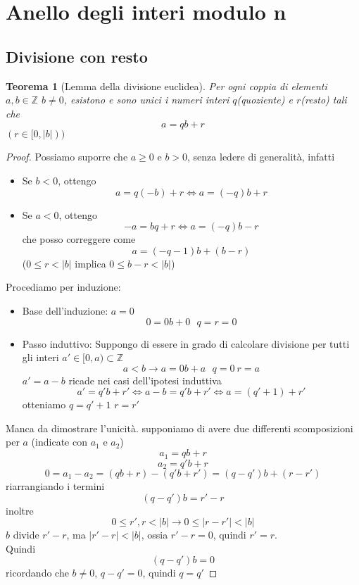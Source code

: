 \documentclass[a4paper]{report}
\newtheorem{theorem}{Teorema}
\begin{document}
\section{Anello degli interi modulo n}
\subsection{Divisione con resto}
\begin{theorem}[Lemma della divisione euclidea]
    Per ogni coppia di elementi $a,b\in\mathbb{Z}$ $b\neq 0$, esistono e sono unici i numeri interi $q$(quoziente) e $r$(resto) tali che
    \[
        a=qb+r
    \]
    $(r\in[0,|b|))$
\end{theorem}
\begin{proof}
    Possiamo suporre che $a\geq 0$ e $b>0$, senza ledere di generalità, infatti
    \begin{itemize}
        \item Se $b<0$, ottengo
              \[
                  a=q(-b)+r\Leftrightarrow a=(-q)b+r
              \]
        \item Se $a<0$, ottengo
              \[
                  -a=bq+r\Leftrightarrow a=(-q)b-r
              \]
              che posso correggere come
              \[
                  a=(-q-1)b+(b-r)
              \]
              ($0\leq r<|b|$ implica $0\leq b-r <|b|$)
    \end{itemize}
    Procediamo per induzione:
    \begin{itemize}
        \item Base dell'induzione: $a=0$
              \[
                  0=0b+0\ \ \ q=r=0
              \]
        \item Passo induttivo: Suppongo di essere in grado di calcolare divisione per tutti gli interi $a'\in[0,a)\subset\mathbb{Z}$
              \[
                  a<b\rightarrow a=0b+a\ \ \ q=0\ r=a
              \]
              $a'=a-b$ ricade nei casi dell'ipotesi induttiva
              \[
                  a'=q'b+r'\Leftrightarrow a-b=q'b+r'\Leftrightarrow a=(q'+1)+r'
              \]
              otteniamo $q=q'+1$ $r=r'$
    \end{itemize}
    Manca da dimostrare l'unicità. supponiamo di avere due differenti scomposizioni per $a$ (indicate con $a_1$ e $a_2$)
    \[
        a_1=qb+r
    \]
    \[
        a_2=q'b+r
    \]
    \[
        0=a_1-a_2=(qb+r)-(q'b+r')=(q-q')b+(r-r')
    \]
    riarrangiando i termini
    \[
        (q-q')b=r'-r
    \]
    inoltre
    \[
        0\leq r',r<|b|\rightarrow 0\leq |r-r'|<|b|
    \]
    $b$ divide $r'-r$, ma $|r'-r|<|b|$, ossia $r'-r=0$, quindi $r'=r$.\\
    Quindi
    \[
        (q-q')b=0
    \]
    ricordando che $b\neq 0$, $q-q'=0$, quindi $q=q'$
\end{proof}
\end{document}
